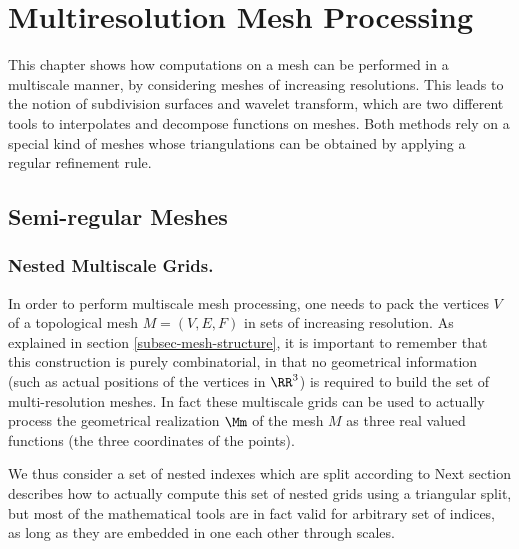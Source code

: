 
\chapter{Multiresolution Mesh Processing}

This chapter shows how computations on a mesh can be performed in a multiscale manner, by considering meshes of increasing resolutions. This leads to the notion of subdivision surfaces and wavelet transform, which are two different tools to interpolates and decompose functions on meshes. Both methods rely on a special kind of meshes whose triangulations can be obtained by applying a regular refinement rule. 


\section{Semi-regular Meshes}

\subsection{Nested Multiscale Grids.}

In order to perform multiscale mesh processing, one needs to pack the vertices $V$ of a topological mesh $M = (V,E,F)$ in sets of increasing resolution. As explained in section \ref{subsec-mesh-structure}, it is important to remember that this construction is purely combinatorial, in that no geometrical information (such as actual positions of the vertices in $\RR^3$) is required to build the set of multi-resolution meshes. In fact these multiscale grids can be used to actually process the geometrical realization $\Mm$ of the mesh $M$ as three real valued functions (the three coordinates of the points).

We thus consider a set of nested indexes 
which are split according to 
Next section describes how to actually compute this set of nested grids using a triangular split, but most of the mathematical tools are in fact valid for arbitrary set of indices, as long as they are embedded in one each other through scales.

